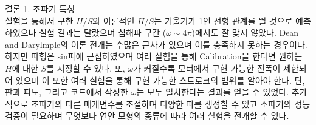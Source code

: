 \documentclass[Junlampaper, portrait]{Julam_PosterK}
\begin{document}
\begin{poster}
\begin{posterbox}[name=result,column=3,]{결론  }
\small {1. 조파기 특성\\}
    \scriptsize{
    실험을 통해서 구한 $H/S$와 이론적인 $H/S$는 기울기가 1인 선형 관계를 띌 것으로 예측하였으나 실험 결과는 달랐으며 심해파 구간 ($\omega\sim4\pi$)에서도 잘 맞지 않았다. Dean and Darylmple의 이론 전개는 수많은 근사가 있으며 이를 충족하지 못하는 경우이다. 하지만 파형은 sin파에 근접하였으며 여러 실험을 통해 Calibration을 한다면 원하는 $H$에 대한 $S$를 지정할 수 있다. 또, $\omega$가 커질수록 모터에서 구현 가능한 진폭이 제한되어 있으며 이 또한 여러 실험을 통해 구현 가능한 스트로크의 범위를 알아야 한다. 단, 판과 파도, 그리고 코드에서 작성한 $\omega$는 모두 일치한다는 결과를 얻을 수 있었다. 추가적으로 조파기의 다른 매개변수를 조절하며 다양한 파를 생성할 수 있고 소파기의 성능 검증이 필요하며 무엇보다 연안 모형의 종류에 따라 여러 실험을 전개할 수 있다.
    }
    



\end{posterbox}
\end{poster}
\end{document}
